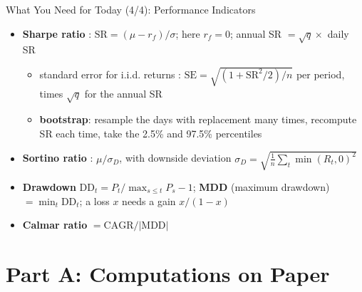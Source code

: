 \begin{frame}{What You Need for Today (4/4): Performance Indicators}
\itemsize{\footnotesize}
\begin{itemize}
    \item \textbf{Sharpe ratio} : $\text{SR} = (\mu - r_f)/\sigma$; here $r_f = 0$; annual SR $= \sqrt{q} \times$ daily SR
    \begin{itemize}
        \item standard error for i.i.d. returns : $\text{SE} = \sqrt{(1 + \text{SR}^2/2)/n}$ per period, times $\sqrt{q}$ for the annual SR
        \item \textbf{bootstrap}: resample the days with replacement many times, recompute SR each time, take the 2.5\% and 97.5\% percentiles
    \end{itemize}
    \item \textbf{Sortino ratio} : $\mu/\sigma_D$, with downside deviation $\sigma_D = \sqrt{\frac1n\sum_t \min(R_t, 0)^2}$
    \item \textbf{Drawdown} $\text{DD}_t = P_t/\max_{s \le t} P_s - 1$; \textbf{MDD} (maximum drawdown) $= \min_t \text{DD}_t$; a loss $x$ needs a gain $x/(1-x)$
    \item \textbf{Calmar ratio} $= \text{CAGR}/|\text{MDD}|$
\end{itemize}
\end{frame}


\section{Part A: Computations on Paper}

